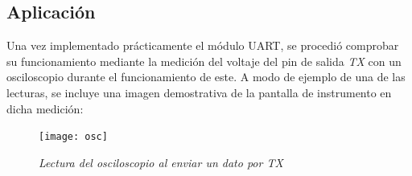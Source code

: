 \documentclass{article}
\begin{document}
\subsection{Aplicación}

Una vez implementado prácticamente el módulo UART, se procedió comprobar su funcionamiento mediante la medición
del voltaje del pin de salida \textit{TX} con un osciloscopio durante el funcionamiento de este.
A modo de ejemplo de una de las lecturas, se incluye una imagen demostrativa de la pantalla de instrumento
en dicha medición:

\begin{figure}[H]
\texttt{[image: osc]}
\caption{\textit{Lectura del osciloscopio al enviar un dato por TX}}
\end{figure}
\end{document}
